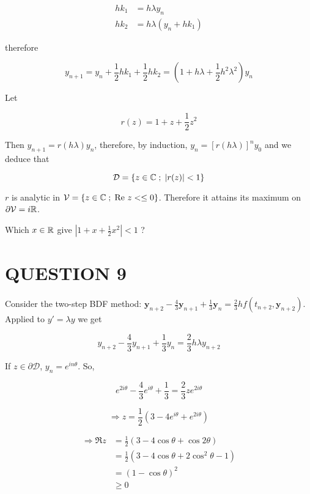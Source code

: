 \documentclass[a4paper]{article}
\begin{document}
\begin{enumerate}
	\begin{align*}
	h k_{1} & = h \lambda y_{n} \\
	h k_{2} & = h \lambda ( y_{n} + h k_{1}) 
	\end{align*}
	
	therefore
	
	\[ y_{n+1} = y_{n} + \frac{1}{2} h k_{1} + \frac{1}{2} h k_{2} = (1+ h \lambda  + \frac{1}{2} h^{2} \lambda^{2} ) y_{n}    \]
	
	Let 
	
	\[ r(z) = 1 + z + \frac{1}{2} z^{2}  \]
	
	Then $ y_{n+1} = r(h \lambda) y_{n} $, therefore, by induction, $ y_{n} = [r(h \lambda)]^{n} y_{0} $ and we deduce that 
	
	\[ \mathcal{D} = \{  z \in \mathbb{C} \; ; \; | r(z) | < 1 \} \]
	
	$ r $ is analytic in $ \mathcal{V} = \{  z \in \mathbb{C} \; ; \; \text{Re } z < \leq 0 \} $. Therefore it attains its maximum on $ \partial \mathcal{V} = i \mathbb{R} $. 
	
	Which $ x \in \mathbb{R} $ give $ | 1 + x + \frac{1}{2} x^{2} | < 1 $ ?
	
\end{enumerate}

\section{QUESTION 9}

Consider the two-step BDF method: $ \mathbf{y}_{n+2} - \frac{4}{3} \mathbf{y}_{n+1} + \frac{1}{3} \mathbf{y}_{n} = \frac{2}{3} hf(t_{n+2},\mathbf{y}_{n+2}) $. Applied to $ y' = \lambda y $ we get 

\[ y_{n+2} - \frac{4}{3} y_{n+1} + \frac{1}{3} y_{n} = \frac{2}{3} h \lambda y_{n+2} \]


If $ z \in \partial \mathcal{D} $, $ y_{n} = e^{i n \theta} $. So,

\[ e^{2i \theta} - \frac{4}{3} e^{i \theta} + \frac{1}{3} = \frac{2}{3} z e^{2 i \theta} \]

\[ \Rightarrow z = \frac{1}{2} \left(   3 - 4 e^{i \theta} + e^{2 i \theta} \right)  \]

\begin{align*}
\Rightarrow \Re z & = \frac{1}{2} \left(  3 - 4 \cos \theta + \cos 2\theta \right)  \\
& = \frac{1}{2} \left(  3 - 4 \cos \theta + 2 \cos^{2} \theta - 1 \right)  \\
& = (1 - \cos \theta)^{2} \\
& \geq 0
\end{align*}
\end{document}
